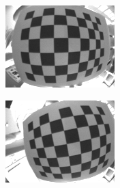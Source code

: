 \begin{figure}[h!]
    \centering
    \begin{subfigure}[b]{0.2\textwidth}
        \centering
        \includegraphics[width=\textwidth]{images/camera/0.png}
    \end{subfigure}
    \begin{subfigure}[b]{0.2\textwidth}
        \centering
        \includegraphics[width=\textwidth]{images/camera/1.png}
    \end{subfigure}
    \begin{subfigure}[b]{0.2\textwidth}
        \centering

\end{subfigure}
\end{figure}
